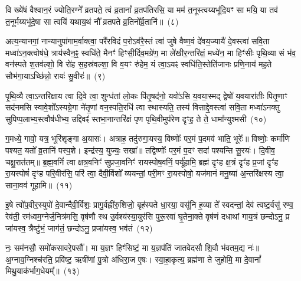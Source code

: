वि ख्ये॑षं वैश्वान॒रं ज्योति॒रग्ने᳚ व्रतपते॒ त्वं व्र॒तानां᳚ व्र॒तप॑तिरसि॒ या मम॑ त॒नूस्त्वय्यभू॑दि॒यꣳ सा मयि॒ या तव॑ त॒नूर्मय्यभू॑दे॒षा सा त्वयि॑ यथाय॒थं नौ᳚ व्रतपते व्र॒तिनो᳚र्व्र॒तानि॑॥~(८)

{\anuvakamend[{गा॒तु॒विद॒भ्येक॑त्रिꣳशच्च}]}%

अत्य॒न्यानगां॒ नान्यानुपा॑गाम॒र्वाक्त्वा॒ परै॑रविदं प॒रो\-ऽव॑रै॒स्तं त्वा॑ जुषे वैष्ण॒वं दे॑वय॒ज्यायै॑ दे॒वस्त्वा॑ सवि॒ता मध्वा॑\-ऽन॒क्त्वोष॑धे॒ त्राय॑स्वैन॒ꣴ॒ स्वधि॑ते॒ मैनꣳ॑ हिꣳसी॒र्दिव॒मग्रे॑ण॒ मा ले॑खीर॒न्तरि॑क्षं॒ मध्ये॑न॒ मा हिꣳ॑सीः पृथि॒व्या सं भ॑व॒ वन॑स्पते श॒तव॑ल्\mbox{}शो॒ वि रो॑ह स॒हस्र॑वल्\mbox{}शा॒ वि व॒यꣳ रु॑हेम॒ यं त्वा॒\-ऽयꣴ स्वधि॑ति॒स्तेति॑जानः प्रणि॒नाय॑ मह॒ते सौभ॑गा॒या\-ऽच्छि॑न्नो॒ रायः॑ सु॒वीरः॑॥~(९)

{\anuvakamend[{यं दश॑ च}]}%

पृ॒थि॒व्यै त्वा॒\-ऽन्तरि॑क्षाय त्वा दि॒वे त्वा॒ शुन्ध॑तां लो॒कः पि॑तृ॒षद॑नो॒ यवो॑\-ऽसि य॒वया॒स्मद् द्वेषो॑ य॒वयारा॑तीः पितृ॒णाꣳ सद॑नमसि स्वावे॒शो᳚\-ऽस्यग्रे॒गा ने॑तृ॒णां वन॒स्पति॒रधि॑ त्वा स्थास्यति॒ तस्य॑ वित्ताद्दे॒वस्त्वा॑ सवि॒ता मध्वा॑\-ऽनक्तु सुपिप्प॒लाभ्य॒स्त्वौष॑धीभ्य॒ उद्दिवꣴ॑ स्तभा॒नान्तरि॑क्षं पृण पृथि॒वीमुप॑रेण दृꣳह॒ ते ते॒ धामा᳚न्युश्मसी~(१०)

ग॒मध्ये॒ गावो॒ यत्र॒ भूरि॑शृङ्गा अ॒यासः॑। अत्राह॒ तदु॑रुगा॒यस्य॒ विष्णोः᳚ पर॒मं प॒दमव॑ भाति॒ भूरेः᳚॥ विष्णोः॒ कर्मा॑णि पश्यत॒ यतो᳚ व्र॒तानि॑ पस्प॒शे। इन्द्र॑स्य॒ युज्यः॒ सखा᳚॥ तद्विष्णोः᳚ पर॒मं प॒दꣳ सदा॑ पश्यन्ति सू॒रयः॑। दि॒वीव॒ चक्षु॒रात॑तम्॥ ब्र॒ह्म॒वनिं॑ त्वा क्षत्र॒वनिꣳ॑ सुप्रजा॒वनिꣳ॑ रायस्पोष॒वनिं॒ पर्यू॑हामि॒ ब्रह्म॑ दृꣳह क्ष॒त्रं दृꣳ॑ह प्र॒जां दृꣳ॑ह रा॒यस्पोषं॑ दृꣳह परि॒वीर॑सि॒ परि॑ त्वा॒ दैवी॒र्विशो᳚ व्ययन्तां॒ परी॒मꣳ रा॒यस्पोषो॒ यज॑मानं मनु॒ष्या॑ अ॒न्त\-रि॑क्षस्य त्वा॒ साना॒वव॑ गूहामि॥~(११)

{\anuvakamend[{उ॒श्म॒सी॒ पोष॒मेका॒न्नविꣳ॑श॒तिश्च॑}]}%

इ॒षे त्वो॑प॒वीर॒स्युपो॑ दे॒वान्दैवी॒र्विशः॒ प्रागु॒र्वह्नी॑रु॒शिजो॒ बृह॑स्पते धा॒रया॒ वसू॑नि ह॒व्या ते᳚ स्वदन्तां॒ देव॑ त्वष्ट॒र्वसु॑ रण्व॒ रेव॑ती॒ रम॑ध्वम॒ग्नेर्ज॒नित्र॑मसि॒ वृष॑णौ स्थ उ॒र्वश्य॑स्या॒युर॑सि पुरू॒रवा॑ घृ॒तेना॒क्ते वृष॑णं दधाथां गाय॒त्रं छन्दो\-ऽनु॒ प्र जा॑यस्व॒ त्रैष्टु॑भं॒ जाग॑तं॒ छन्दो\-ऽनु॒ प्रजा॑यस्व॒ भव॑तं~(१२)

नः॒ सम॑नसौ॒ समो॑कसावरे॒पसौ᳚। मा य॒ज्ञꣳ हिꣳ॑सिष्टं॒ मा य॒ज्ञप॑तिं जातवेदसौ शि॒वौ भ॑वतम॒द्य नः॑॥ अ॒ग्नाव॒ग्निश्च॑रति॒ प्रवि॑ष्ट॒ ऋषी॑णां पु॒त्रो अ॑धिरा॒ज ए॒षः। स्वा॒हा॒कृत्य॒ ब्रह्म॑णा ते जुहोमि॒ मा दे॒वानां᳚ मिथु॒याक॑र्भाग॒धेयम्᳚॥~(१३)

